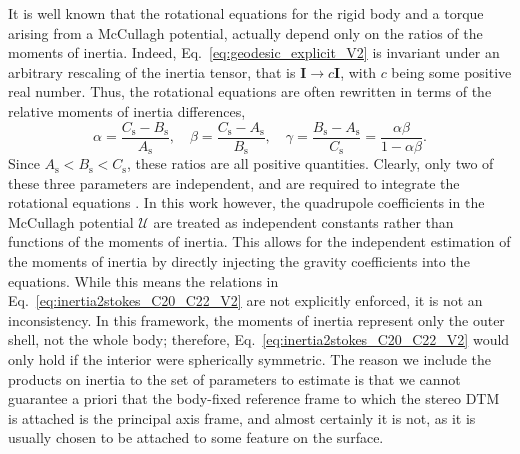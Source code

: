 \documentclass[pdflatex,sn-mathphys-num]{sn-jnl}%
\theoremstyle{thmstyleone}%
\theoremstyle{thmstyletwo}%
\theoremstyle{thmstylethree}%
\renewcommand{\vec}[1]{\boldsymbol{#1}}
\begin{document}
It is well known that the rotational equations for the rigid body and a torque arising from a McCullagh potential, actually depend only on the ratios of the moments of inertia.
Indeed, Eq.~\eqref{eq:geodesic_explicit_V2} is invariant under an arbitrary rescaling of the inertia tensor, that is ${\vec{I} \rightarrow c \vec{I}}$, with $c$ being some positive real number. 
Thus, the rotational equations are often rewritten in terms of the relative moments of inertia differences,
\begin{equation}
\alpha = \frac{C_\mathrm{s} - B_\mathrm{s}}{A_\mathrm{s}}, \quad
\beta = \frac{C_\mathrm{s} - A_\mathrm{s}}{B_\mathrm{s}}, \quad
\gamma = \frac{B_\mathrm{s} - A_\mathrm{s}}{C_\mathrm{s}} %
= \frac{\alpha\beta}{1-\alpha\beta}.
\end{equation}
Since ${A_\mathrm{s}<B_\mathrm{s}<C_\mathrm{s}}$, these ratios are all positive quantities.
Clearly, only two of these three parameters are independent, and are required to integrate the rotational equations \citep{1965AJ.....70..466E}.
%
In this work however, the quadrupole coefficients in the McCullagh potential $\mathcal{U}$ are treated as independent constants rather than functions of the moments of inertia. This allows for the independent estimation of the moments of inertia by directly injecting the gravity coefficients into the equations. While this means the relations in Eq.~\ref{eq:inertia2stokes_C20_C22_V2} are not explicitly enforced, it is not an inconsistency. In this framework, the moments of inertia represent only the outer shell, not the whole body; therefore, Eq.~\ref{eq:inertia2stokes_C20_C22_V2} would only hold if the interior were spherically symmetric.
%
The reason we include the products on inertia to the set of parameters to estimate is that we cannot guarantee a priori that the body-fixed reference frame to which the stereo DTM is attached is the principal axis frame, and almost certainly it is not, as it is usually chosen to be attached to some feature on the surface.

\end{document}
